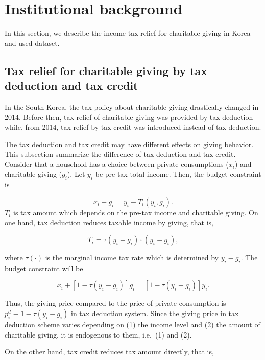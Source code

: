 \documentclass[ review  , 3p ]{elsarticle}
\begin{document}
  \hypertarget{institutional-background}{%
  \section{Institutional background}\label{institutional-background}}
  
  In this section, we describe the income tax relief for charitable giving in Korea and used dataset.
  
  \hypertarget{tax-relief-for-charitable-giving-by-tax-deduction-and-tax-credit}{%
  \subsection{Tax relief for charitable giving by tax deduction and tax credit}\label{tax-relief-for-charitable-giving-by-tax-deduction-and-tax-credit}}
  
  In the South Korea, the tax policy about charitable giving drastically changed in 2014. Before then, tax relief of charitable giving was provided by tax deduction while, from 2014, tax relief by tax credit was introduced instead of tax deduction.
  
  The tax deduction and tax credit may have different effects on giving behavior. This subsection summarize the difference of tax deduction and tax credit.
  Consider that a household has a choice between private consumptions (\(x_i\)) and charitable giving (\(g_i\)). Let \(y_i\) be pre-tax total income.
  Then, the budget constraint is
  
  \[
      x_i + g_i = y_i - T_i(y_i, g_i).
  \]
  \(T_i\) is tax amount which depends on the pre-tax income and charitable giving.
  On one hand, tax deduction reduces taxable income by giving, that is,
  
  \[
      T_i = \tau(y_i - g_i) \cdot (y_i - g_i),
  \]
  
  where \(\tau(\cdot)\) is the marginal income tax rate which is determined by \(y_i - g_i\). The budget constraint will be
  
  \[
      x_i + [1 - \tau(y_i - g_i)]g_i = [1 - \tau(y_i - g_i)] y_i.
  \]
  
  Thus, the giving price compared to the price of private consumption is \(p_i^{d} \equiv 1 - \tau(y_i - g_i)\) in tax deduction system. Since the giving price in tax deduction scheme varies depending on (1) the income level and (2) the amount of charitable giving, it is endogenous to them, i.e.~(1) and (2).
  
  On the other hand, tax credit reduces tax amount directly, that is,
  
\end{document}
